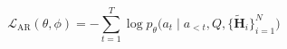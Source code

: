 \begin{equation}
    \mathcal{L}_{\mathrm{AR}}(\theta,\phi) = -\sum_{t=1}^{T}\log p_{\theta}\big(a_t \mid a_{<t}, Q, \{\tilde{\mathbf{H}}_i\}_{i=1}^{N}\big)
    \label{eq:loss}
\end{equation}